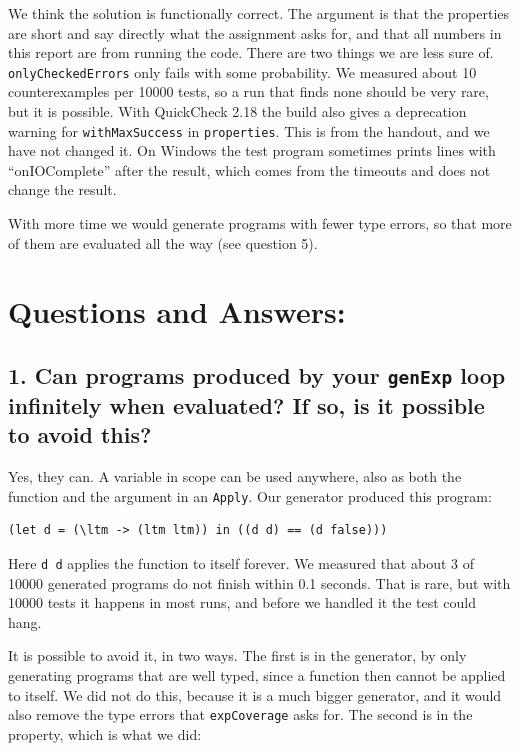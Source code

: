 We think the solution is functionally correct. The argument is that the properties are short and say directly what the assignment asks for, and that all numbers in this report are from running the code. There are two things we are less sure of. \texttt{onlyCheckedErrors} only fails with some probability. We measured about 10 counterexamples per 10000 tests, so a run that finds none should be very rare, but it is possible. With QuickCheck 2.18 the build also gives a deprecation warning for \texttt{withMaxSuccess} in \texttt{properties}. This is from the handout, and we have not changed it. On Windows the test program sometimes prints lines with ``onIOComplete'' after the result, which comes from the timeouts and does not change the result.

With more time we would generate programs with fewer type errors, so that more of them are evaluated all the way (see question 5).

\section{Questions and Answers:}

\subsection[Question 1]{1. Can programs produced by your \texttt{genExp} loop infinitely when evaluated? If so, is it possible to avoid this?}

Yes, they can. A variable in scope can be used anywhere, also as both the function and the argument in an \texttt{Apply}. Our generator produced this program:

\begin{lstlisting}
(let d = (\ltm -> (ltm ltm)) in ((d d) == (d false)))
\end{lstlisting}

Here \texttt{d d} applies the function to itself forever. We measured that about 3 of 10000 generated programs do not finish within 0.1 seconds. That is rare, but with 10000 tests it happens in most runs, and before we handled it the test could hang.

It is possible to avoid it, in two ways. The first is in the generator, by only generating programs that are well typed, since a function then cannot be applied to itself. We did not do this, because it is a much bigger generator, and it would also remove the type errors that \texttt{expCoverage} asks for. The second is in the property, which is what we did:


